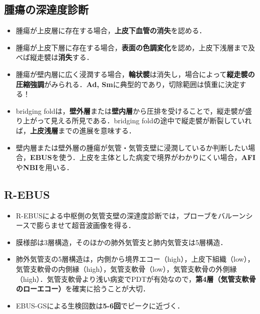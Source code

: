 \subsection{腫瘍の深達度診断}
\begin{itemize}


\item 腫瘍が上皮層に存在する場合，\textbf{上皮下血管の消失}を認める．
\item 腫瘍が上皮下層に存在する場合，\textbf{表面の色調変化}を認め，上皮下浅層まで及べば縦走襞は\textbf{消失}する．
\item 腫瘍が壁内層に広く浸潤する場合，\textbf{輪状襞}は消失し，場合によって\textbf{縦走襞の圧縮強調}がみられる．\textbf{Ad, Sm}に典型的であり，切除範囲は慎重に決定する！

\item bridging foldは，\textbf{壁外層}または\textbf{壁内層}から圧排を受けることで，縦走襞が盛り上がって見える所見である．bridging foldの途中で縦走襞が断裂していれば，\textbf{上皮浅層}までの進展を意味する．

\item 壁内層または壁外層の腫瘍が気管・気管支壁に浸潤しているか判断したい場合，\textbf{EBUS}を使う．上皮を主体とした病変で境界がわかりにくい場合，\textbf{AFI}や\textbf{NBI}を用いる．


\end{itemize}

\subsection{R-EBUS}

\begin{itemize}
\item R-EBUSによる中枢側の気管支壁の深達度診断では，プローブをバルーンシースで膨らませて超音波画像を得る．
\item 膜様部は3層構造，そのほかの肺外気管支と肺内気管支は5層構造．
\item 肺外気管支の5層構造は，内側から境界エコー（high），上皮下組織（low），気管支軟骨の内側縁（high），気管支軟骨（low），気管支軟骨の外側縁（high）．気管支軟骨より浅い病変でPDTが有効なので，\textbf{第4層（気管支軟骨のローエコー）}を確実に拾うことが大切．
\item EBUS-GSによる生検回数は\textbf{5-6回}でピークに近づく．
\end{itemize}

